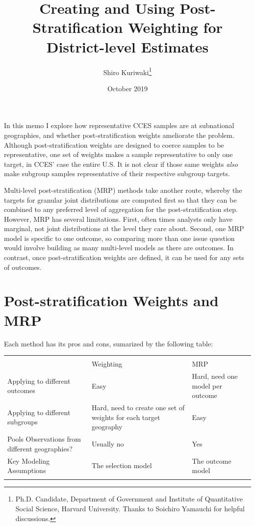 \documentclass[11pt]{article}
\title{\large\textbf{Creating and Using Post-Stratification Weighting for District-level Estimates}}
\author{\normalsize  Shiro Kuriwaki\thanks{Ph.D. Candidate, Department of Government and Institute of Quantitative Social Science, Harvard University. Thanks to Soichiro Yamauchi for helpful discussions.}}
\date{\normalsize October 2019}
\begin{document}
\maketitle

\onehalfspacing

In this memo I explore how representative CCES samples are at subnational geographies, and whether post-stratification weights ameliorate the problem. Although post-stratification weights are designed to coerce samples to be representative, one set of weights makes a sample representative to only one target, in CCES' case the entire U.S. It is not clear if those same weights \emph{also} make subgroup samples representative of their respective subgroup targets. 

Multi-level post-stratification (MRP) methods take another route, whereby the targets for granular joint distributions are computed first so that they can be combined to any preferred level of aggregation for the post-stratification step. However, MRP has several limitations. First, often times analysts only have marginal, not joint distributions at the level they care about. Second, one MRP model is specific to one outcome, so comparing more than one issue question would involve building as many multi-level models as there are outcomes. In contrast, once post-stratification weights are defined, it can be used for any sets of outcomes. 

\section{Post-stratification Weights and MRP}

Each method has its pros and cons, sumarized by the following table:

\begin{table}[!h]
\centering
\small
\begin{tabularx}{0.9\linewidth}{p{5cm}XX}
\toprule\\
& Weighting & MRP \\\midrule
Applying to different outcomes & Easy & Hard, need one model per outcome\\
Applying to different subgroups & Hard, need to create one set of weights for each target geography & Easy\\
Pools Observations from different geographies? & Usually no & Yes\\
Key Modeling Assumptions & The selection model & The outcome model \\
\\\bottomrule
\end{tabularx}
\end{table}
\end{document}
